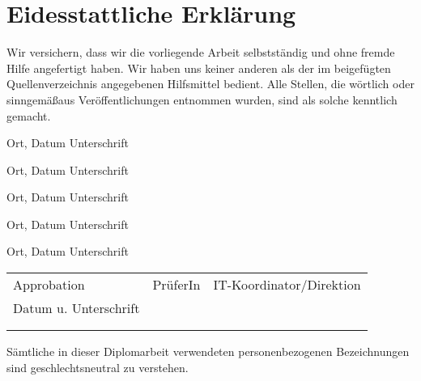 \chapter*{Eidesstattliche Erkl\"arung}
Wir versichern, dass wir die vorliegende Arbeit selbstst\"andig und ohne fremde Hilfe angefertigt haben. Wir haben uns keiner anderen als der im beigef\"ugten Quellenverzeichnis angegebenen Hilfsmittel bedient. Alle Stellen, die w\"ortlich oder sinngem\"a\ss aus Ver\"offentlichungen entnommen wurden, sind als solche kenntlich gemacht.

\vspace{0.5cm}

\hspace{1.5cm} Ort, Datum \hfill Unterschrift \hspace{1.5cm}

\vspace{1.0cm}

\hspace{1.5cm} Ort, Datum \hfill Unterschrift \hspace{1.5cm}

\vspace{1.0cm}

\hspace{1.5cm} Ort, Datum \hfill Unterschrift \hspace{1.5cm}

\vspace{1.0cm}

\hspace{1.5cm} Ort, Datum \hfill Unterschrift \hspace{1.5cm}

\vspace{1.0cm}

\hspace{1.5cm} Ort, Datum \hfill Unterschrift \hspace{1.5cm}

\vspace{1.0cm}

\begin{table}[htbp]
\centering
\begin{tabular}{|p{4cm}|p{4cm}|p{5cm}|}
\hline
  Approbation & Pr\"uferIn & IT-Koordinator/Direktion \\
  Datum u. Unterschrift & & \\
  && \\
  && \\
\hline
\end{tabular}
\end{table}

\begin{center}
S\"amtliche in dieser Diplomarbeit verwendeten personenbezogenen Bezeichnungen sind geschlechtsneutral zu verstehen.
\end{center}